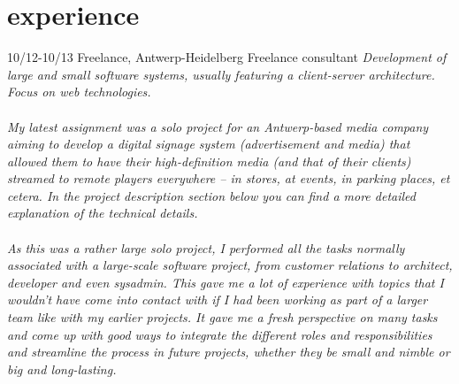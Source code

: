 \documentclass[]{friggeri-cv}
\begin{document}
\section{experience}

\begin{entrylist}
  \entry
    {10/12-10/13}
    {Freelance, Antwerp-Heidelberg}
    {Freelance consultant}
    {\emph{Development of large and small software systems, usually featuring a client-server architecture. Focus on web technologies. \\\\ My latest assignment was a solo project for an Antwerp-based media company aiming to develop a digital signage system (advertisement and media) that allowed them to have their high-definition media (and that of their clients) streamed to remote players everywhere -- in stores, at events, in parking places, et cetera. In the project description section below you can find a more detailed explanation of the technical details. \\\\ As this was a rather large solo project, I performed all the tasks normally associated with a large-scale software project, from customer relations to architect, developer and even sysadmin. This gave me a lot of experience with topics that I wouldn't have come into contact with if I had been working as part of a larger team like with my earlier projects. It gave me a fresh perspective on many tasks and come up with good ways to integrate the different roles and responsibilities and streamline the process in future projects, whether they be small and nimble or big and long-lasting.
    }}
\end{entrylist}

\end{document}

